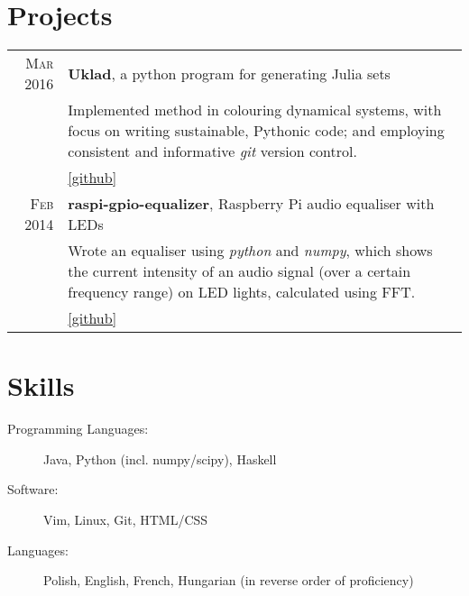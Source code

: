 \documentclass[a4paper,10pt]{article}
\begin{document}
\section{Projects}
\begin{tabular}{r|p{11cm}}
    \textsc{Mar} 2016 & \textbf{Uklad}, a python program for generating Julia sets\\
                      & \footnotesize{Implemented method in colouring dynamical systems, with focus on writing sustainable, Pythonic code; and employing consistent and informative \emph{git} version control.}\\
                      & \href{http://github.com/Karoal/Uklad}{\footnotesize{\hfill[github]}}\\
    \textsc{Feb} 2014 & \textbf{raspi-gpio-equalizer}, Raspberry Pi audio equaliser with LEDs\\
                      & \footnotesize{Wrote an equaliser using \emph{python} and \emph{numpy}, which shows the
                        current intensity of an audio signal (over a certain frequency range) on LED lights, calculated using FFT.}\\
                      & \href{http://github.com/Karoal/raspi-gpio-equalizer}{\footnotesize{\hfill[github]}}
\end{tabular}

\section{Skills}
\begin{description}
    \item [Programming Languages:] Java, Python (incl. numpy/scipy), Haskell
    \item [Software:] Vim, Linux, Git, HTML/CSS
    \item [Languages:] Polish, English, French, Hungarian \footnotesize{(in reverse order of proficiency)}
\end{description}



\end{document}
